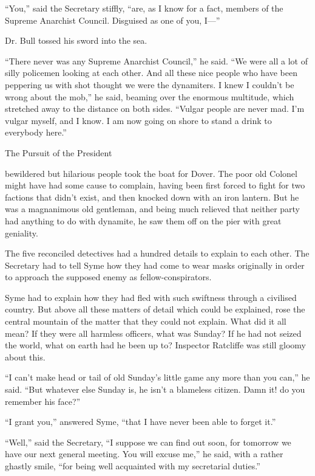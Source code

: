 “You,” said the Secretary stiffly, “are, as I know for a fact, members of the Supreme Anarchist Council. Disguised as one of you, I⁠—”

Dr. Bull tossed his sword into the sea.

“There never was any Supreme Anarchist Council,” he said. “We were all a lot of silly policemen looking at each other. And all these nice people who have been peppering us with shot thought we were the dynamiters. I knew I couldn’t be wrong about the mob,” he said, beaming over the enormous multitude, which stretched away to the distance on both sides. “Vulgar people are never mad. I’m vulgar myself, and I know. I am now going on shore to stand a drink to everybody here.”

\chap[pursuitof] The Pursuit of the President

 bewildered but hilarious people took the boat for Dover. The poor old Colonel might have had some cause to complain, having been first forced to fight for two factions that didn’t exist, and then knocked down with an iron lantern. But he was a magnanimous old gentleman, and being much relieved that neither party had anything to do with dynamite, he saw them off on the pier with great geniality.

The five reconciled detectives had a hundred details to explain to each other. The Secretary had to tell Syme how they had come to wear masks originally in order to approach the supposed enemy as fellow-conspirators.

Syme had to explain how they had fled with such swiftness through a civilised country. But above all these matters of detail which could be explained, rose the central mountain of the matter that they could not explain. What did it all mean? If they were all harmless officers, what was Sunday? If he had not seized the world, what on earth had he been up to? Inspector Ratcliffe was still gloomy about this.

“I can’t make head or tail of old Sunday’s little game any more than you can,” he said. “But whatever else Sunday is, he isn’t a blameless citizen. Damn it! do you remember his face?”

“I grant you,” answered Syme, “that I have never been able to forget it.”

“Well,” said the Secretary, “I suppose we can find out soon, for tomorrow we have our next general meeting. You will excuse me,” he said, with a rather ghastly smile, “for being well acquainted with my secretarial duties.”

